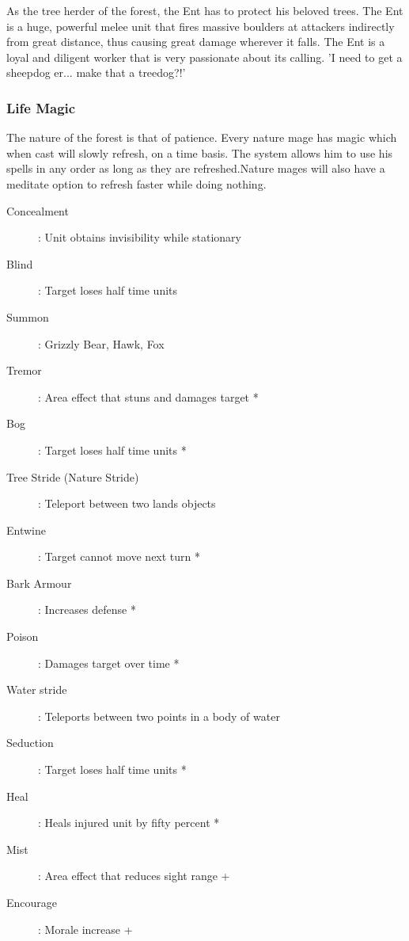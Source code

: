 \documentclass[a4paper]{article}
\begin{document}
As the tree herder of the forest, the Ent has to protect his beloved trees.  The Ent is a huge, powerful melee unit that fires massive boulders at attackers indirectly from great distance,  thus causing great damage wherever it falls. The Ent is a loyal and diligent worker that is very passionate about its calling. 'I need to get a sheepdog er... make that a treedog?!'

\subsubsection{Life Magic}

The nature of the forest is that of patience. Every nature mage has magic which when cast will slowly refresh, on a time basis. The system allows him to use his spells in any order as long as they are refreshed.Nature mages will also have a meditate option to refresh faster while doing nothing.

\begin{description}
\item[Concealment]: Unit obtains invisibility while stationary
\item[Blind]: Target loses half time units
\end{description}

\begin{description}
\item[Summon]: Grizzly Bear, Hawk, Fox
\item[Tremor]: Area effect that stuns and damages target *
\item[Bog]: Target loses half time units *
\end{description}

\begin{description}
\item[Tree Stride (Nature Stride)]: Teleport between two lands objects
\item[Entwine]: Target cannot move next turn *
\item[Bark Armour]: Increases defense *
\item[Poison]: Damages target over time * 
\end{description}

\begin{description}
\item[Water stride]: Teleports between two points in a body of water
\item[Seduction]: Target loses half time units *
\item[Heal]: Heals injured unit by fifty percent *
\item[Mist]: Area effect that reduces sight range +
\item[Encourage]: Morale increase +
\end{description}
\end{document}

